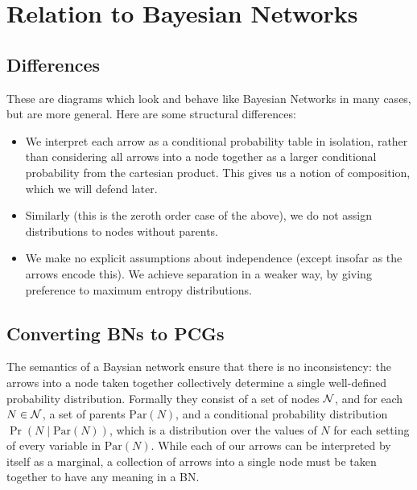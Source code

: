 \documentclass{article}
\begin{document}
	

	\section{Relation to Bayesian Networks}
	
	\subsection{Differences}
	These are diagrams which look and behave like Bayesian Networks in many cases, but are more general. Here are some structural differences:
	\begin{itemize}[nosep]
		\item We interpret each arrow as a conditional probability table in isolation, rather than considering all arrows into a node together as a larger conditional probability from the cartesian product. This gives us a notion of composition, which we will defend later.
		\item Similarly (this is the zeroth order case of the above), we do not assign distributions to nodes without parents. 
		\item We make no explicit assumptions about independence (except insofar as the arrows encode this). We achieve separation in a weaker way, by giving preference to maximum entropy distributions.
	\end{itemize}

	
	\subsection{Converting BNs to PCGs}
	
	\label{sec:convert2bn}
	The semantics of a Baysian network ensure that there is no inconsistency: the arrows into a node taken together collectively determine a single well-defined probability distribution. Formally they consist of a set of nodes $\cal N$, and for each $N \in \cal N$, a set of parents $\mathrm{Par}(N)$, and a conditional probability distribution $\Pr( N \mid \mathrm{Par}(N))$, which is a distribution over the values of $N$ for each setting of every variable in $\mathrm{Par}(N)$. While each of our arrows can be interpreted by itself as a marginal, a collection of arrows into a single node must be taken together to have any meaning in a BN. 
	
\end{document}
